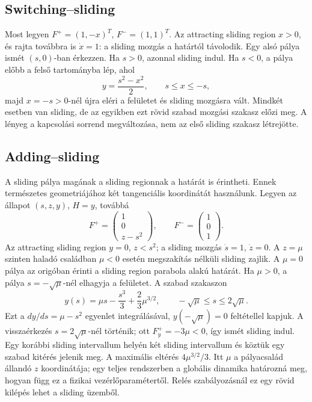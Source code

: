 \subsection{Switching--sliding}
\examplebody

Most legyen $F^+=(1,-x)^T$, $F^-=(1,1)^T$. Az attracting sliding region $x>0$, és rajta továbbra is $\dot x=1$: a sliding mozgás a határtól távolodik. Egy alsó pálya ismét $(s,0)$-ban érkezzen. Ha $s>0$, azonnal sliding indul. Ha $s<0$, a pálya előbb a felső tartományba lép, ahol
\[
 y=\frac{s^2-x^2}{2},\qquad s\leq x\leq-s,
\]
majd $x=-s>0$-nél újra eléri a felületet és sliding mozgásra vált. Mindkét esetben van sliding, de az egyikben ezt rövid szabad mozgási szakasz előzi meg. A lényeg a kapcsolási sorrend megváltozása, nem az első sliding szakasz létrejötte.
\exampleend

\subsection{Adding--sliding}
\examplebody

A sliding pálya magának a sliding regionnak a határát is érintheti. Ennek természetes geometriájához két tangenciális koordinátát használunk. Legyen az állapot $(s,z,y)$, $H=y$, továbbá
\begin{equation}
 F^+=\begin{pmatrix}1\\0\\z-s^2\end{pmatrix},\qquad
 F^-=\begin{pmatrix}1\\0\\1\end{pmatrix}.
 \label{eq:adding_local}
\end{equation}
Az attracting sliding region $y=0$, $z<s^2$; a sliding mozgás $\dot s=1$, $\dot z=0$. A $z=\mu$ szinten haladó családban $\mu<0$ esetén megszakítás nélküli sliding zajlik. A $\mu=0$ pálya az origóban érinti a sliding region parabola alakú határát. Ha $\mu>0$, a pálya $s=-\sqrt\mu$-nél elhagyja a felületet. A szabad szakaszon
\begin{equation}
 y(s)=\mu s-\frac{s^3}{3}+\frac23\mu^{3/2},\qquad
 -\sqrt\mu\leq s\leq2\sqrt\mu.
\end{equation}
Ezt a $dy/ds=\mu-s^2$ egyenlet integrálásával, $y(-\sqrt\mu)=0$ feltétellel kapjuk. A visszaérkezés $s=2\sqrt\mu$-nél történik; ott $F_y^+=-3\mu<0$, így ismét sliding indul. Egy korábbi sliding intervallum helyén két sliding intervallum és köztük egy szabad kitérés jelenik meg. A maximális eltérés $4\mu^{3/2}/3$. Itt $\mu$ a pályacsalád állandó $z$ koordinátája; egy teljes rendszerben a globális dinamika határozná meg, hogyan függ ez a fizikai vezérlőparamétertől. Relés szabályozásnál ez egy rövid kilépés lehet a sliding üzemből.

